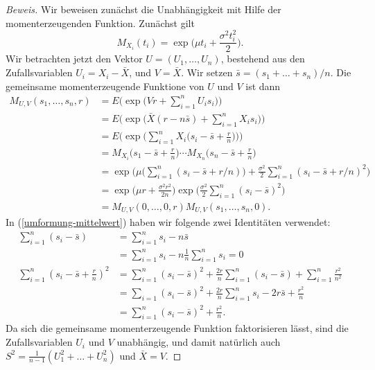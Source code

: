 \begin{proof}[Beweis]
Wir beweisen zunächst die Unabhängigkeit mit Hilfe der momenterzeugenden
Funktion.
Zunächst gilt
\begin{equation}
M_{X_i}(t_i)=\exp\biggl(\mu t_i+\frac{\sigma^2t_i^2}2\biggr).
\end{equation}
Wir betrachten jetzt den Vektor $U=(U_1,\dots,U_n)$, bestehend aus
den Zufallsvariablen $U_i=X_i-\bar X$, und $V=\bar X$.
Wir setzen $\bar s=(s_1+\dots +s_n)/n$.
Die gemeinsame momenterzeugende Funktione
von $U$ und $V$ ist dann
\begin{align}
M_{U,V}(s_1,\dots,s_n,r)
&=
E\biggl(\exp\biggl(Vr+\sum_{i=1}^nU_is_i\biggr)\biggr)
\nonumber\\
&=
E\biggl(\exp\biggl(\bar X(r-n\bar s)+\sum_{i=1}^nX_is_i\biggr)\biggr)
\nonumber\\
&=
E\biggl(\exp\biggl(\sum_{i=1}^nX_i\bigl(s_i-\bar s+\frac{r}{n}\bigr)\biggr)\biggr)
\nonumber\\
&=
M_{X_i}\biggl(s_1-\bar s+\frac{r}{n}\biggr)\cdots
M_{X_n}\biggl(s_n-\bar s+\frac{r}{n}\biggr)
\nonumber\\
&=
\exp\biggl(
\mu\biggl(\sum_{i=1}^n(s_i-\bar s+r/n)\biggr)+\frac{\sigma^2}2\sum_{i=1}^n(s_i-\bar s+r/n)^2
\biggr)
\nonumber\\
&=
\exp\biggl(\mu r+\frac{\sigma^2r^2}{2n}\biggr)
\exp\biggl(\frac{\sigma^2}{2}\sum_{i=1}^n(s_i-\bar s)^2\biggr)\label{umformung-mittelwert}
\\
&=
M_{U,V}(0,\dots,0,r)M_{U,V}(s_1,\dots,s_n,0).
\nonumber
\end{align}
In (\ref{umformung-mittelwert}) haben wir folgende zwei Identitäten verwendet:
\begin{align}
\sum_{i=1}^n(s_i-\bar s)
&=
\sum_{i=1}^ns_i-n\bar s
\nonumber\\
&=
\sum_{i=1}^ns_i-n\frac1n\sum_{i=1}^ns_i=0 \label{si-mittelwert}
\\
\sum_{i=1}^n(s_i-\bar s+\frac{r}{n})^2
&=
\sum_{i=1}^n(s_i-\bar s)^2
+\frac{2r}{n}\sum_{i=1}^n(s_i-\bar s)
+\sum_{i=1}^n\frac{r^2}{n^2}
\nonumber\\
&=
\sum_{i=1}(s_i-\bar s)^2
+\frac{2r}{n}\sum_{i=1}^ns_i-2r\bar s
+\frac{r^2}{n}
\nonumber\\
&=
\sum_{i=1}^n(s_i-\bar s)^2+\frac{r^2}{n}.
\label{si-varianz}
\end{align}
Da sich die gemeinsame momenterzeugende Funktion faktorisieren
lässt, sind die Zufallsvariablen $U_i$ und $V$ unabhängig,
und damit natürlich auch $S^2=\frac1{n-1}(U_1^2+\dots+U_n^2)$ und
$\bar X=V$.


\end{proof}
